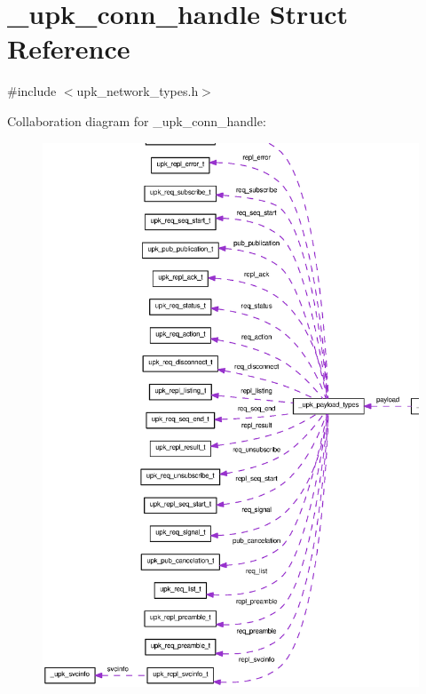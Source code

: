 \section{\_\-upk\_\-conn\_\-handle Struct Reference}
\label{struct__upk__conn__handle}


{\ttfamily \#include $<$upk\_\-network\_\-types.h$>$}



Collaboration diagram for \_\-upk\_\-conn\_\-handle:
\nopagebreak
\begin{figure}[H]
\begin{center}
\leavevmode
\includegraphics[width=400pt]{struct__upk__conn__handle__coll__graph}
\end{center}
\end{figure}
